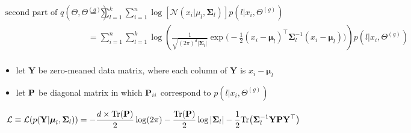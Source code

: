\documentclass{article}
\def\L{{\cal L}}
\def\P{{{\Pr}}}
\def\tr{\text{tr}}
\def\Y{{\bf Y}}
\def\P{{\bf P}}
\def\tr{\text{Tr}}
\def\SIGMA{{\boldsymbol \Sigma}}
\def\MU{\boldsymbol {\mu }}
\def\Y{{\mathbf Y}}
\begin{document}
\begin{equation}
\begin{split}
\text{second part of } q(\Theta, \Theta^{(g)})
&=  \sum_{l=1}^k  \sum_{i=1}^{n} \log [\mathcal{N}(x_i | \mu_{l}, \SIGMA_{l} ) ] p(l|x_i,\Theta^{(g)})\\
&=  \sum_{i=1}^{n} \sum_{l=1}^k \log \left(  \frac{1}{\sqrt {(2\pi )^{d}|{ \SIGMA_l}|}}  {\exp \bigg(-{\frac {1}{2}}( x_i - \MU_l )^\top \SIGMA_l^{-1}(x_i - \MU_l )\bigg)} \right) p(l|x_i,\Theta^{(g)})\\
\end{split}
\end{equation}

\begin{itemize}
\item
let $\Y$ be zero-meaned data matrix, where each {\color{blue} column} of $\Y$ is $x_i - \MU_l$
\item
let $\P$ be diagonal matrix in which $\P_{ii}$ correspond to $p( l | x_i,\Theta^{(g)})$
\end{itemize}

\begin{equation}
\begin{split}
\L \equiv \L(p(\Y| \MU_l, \SIGMA_l)) &= - \frac{d \times \tr(\P) }{2} \log(2 \pi)  - \frac{\tr(\P)}{2} \log | \SIGMA_l | - \frac{1}{2}  \tr \big( \SIGMA_l^{-1} \Y \P {\Y}^\top \big)\\
\end{split}
\end{equation}



\end{document}
